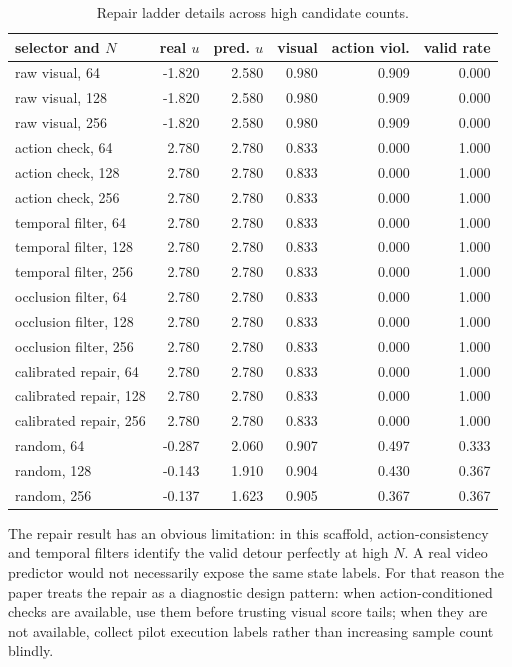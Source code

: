 \documentclass{article}
\begin{document}
\begin{table}[tbp]
  \centering
  \small
  \caption{Repair ladder details across high candidate counts.}
  \label{tab:repair-full}
  \begin{tabular}{@{}lrrrrr@{}}
    \toprule
    selector and \(N\) & real \(u\) & pred. \(u\) & visual & action viol. & valid rate \\
    \midrule
    raw visual, 64 & -1.820 & 2.580 & 0.980 & 0.909 & 0.000 \\
    raw visual, 128 & -1.820 & 2.580 & 0.980 & 0.909 & 0.000 \\
    raw visual, 256 & -1.820 & 2.580 & 0.980 & 0.909 & 0.000 \\
    action check, 64 & 2.780 & 2.780 & 0.833 & 0.000 & 1.000 \\
    action check, 128 & 2.780 & 2.780 & 0.833 & 0.000 & 1.000 \\
    action check, 256 & 2.780 & 2.780 & 0.833 & 0.000 & 1.000 \\
    temporal filter, 64 & 2.780 & 2.780 & 0.833 & 0.000 & 1.000 \\
    temporal filter, 128 & 2.780 & 2.780 & 0.833 & 0.000 & 1.000 \\
    temporal filter, 256 & 2.780 & 2.780 & 0.833 & 0.000 & 1.000 \\
    occlusion filter, 64 & 2.780 & 2.780 & 0.833 & 0.000 & 1.000 \\
    occlusion filter, 128 & 2.780 & 2.780 & 0.833 & 0.000 & 1.000 \\
    occlusion filter, 256 & 2.780 & 2.780 & 0.833 & 0.000 & 1.000 \\
    calibrated repair, 64 & 2.780 & 2.780 & 0.833 & 0.000 & 1.000 \\
    calibrated repair, 128 & 2.780 & 2.780 & 0.833 & 0.000 & 1.000 \\
    calibrated repair, 256 & 2.780 & 2.780 & 0.833 & 0.000 & 1.000 \\
    random, 64 & -0.287 & 2.060 & 0.907 & 0.497 & 0.333 \\
    random, 128 & -0.143 & 1.910 & 0.904 & 0.430 & 0.367 \\
    random, 256 & -0.137 & 1.623 & 0.905 & 0.367 & 0.367 \\
    \bottomrule
  \end{tabular}
\end{table}

The repair result has an obvious limitation: in this scaffold, action-consistency and temporal filters identify the valid detour perfectly at high \(N\). A real video predictor would not necessarily expose the same state labels. For that reason the paper treats the repair as a diagnostic design pattern: when action-conditioned checks are available, use them before trusting visual score tails; when they are not available, collect pilot execution labels rather than increasing sample count blindly.
\end{document}
